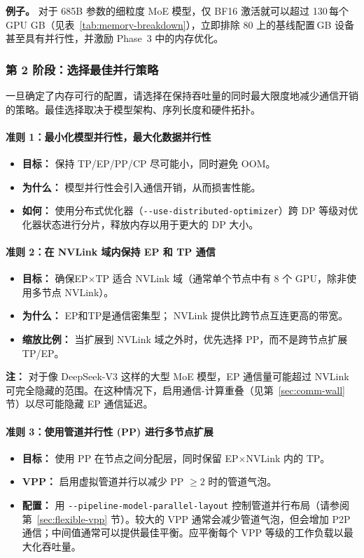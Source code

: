 \documentclass[10pt,logo,copyright]{nvidiatechreport_zh}
\begin{document}
\noindent\textbf{例子。} 对于 685B 参数的细粒度 MoE 模型，仅 BF16 激活就可以超过 130\,每个 GPU GB（见表~\ref{tab:memory-breakdown}），立即排除 80 上的基线配置\,GB 设备甚至具有并行性，并激励 Phase~3 中的内存优化。

\subsubsection{第 2 阶段：选择最佳并行策略}

一旦确定了内存可行的配置，请选择在保持吞吐量的同时最大限度地减少通信开销的策略。最佳选择取决于模型架构、序列长度和硬件拓扑。

\paragraph*{准则 1：最小化模型并行性，最大化数据并行性}
\begin{itemize}
    \item \textbf{目标：} 保持 TP/EP/PP/CP 尽可能小，同时避免 OOM。
    \item \textbf{为什么：} 模型并行性会引入通信开销，从而损害性能。
    \item \textbf{如何：} 使用分布式优化器（\texttt{-{}-use-distributed-optimizer}）跨 DP 等级对优化器状态进行分片，释放内存以用于更大的 DP 大小。
\end{itemize}

\paragraph*{准则 2：在 NVLink 域内保持 EP 和 TP 通信}
\begin{itemize}
    \item \textbf{目标：} 确保EP$\times$TP 适合 NVLink 域（通常单个节点中有 8 个 GPU，除非使用多节点 NVLink）。
    \item \textbf{为什么：} EP和TP是通信密集型； NVLink 提供比跨节点互连更高的带宽。
    \item \textbf{缩放比例：} 当扩展到 NVLink 域之外时，优先选择 PP，而不是跨节点扩展 TP/EP。
\end{itemize}

\noindent\textbf{注：} 对于像 DeepSeek-V3 这样的大型 MoE 模型，EP 通信量可能超过 NVLink 可完全隐藏的范围。在这种情况下，启用通信-计算重叠（见第~\ref{sec:comm-wall} 节）以尽可能隐藏 EP 通信延迟。

\paragraph*{准则 3：使用管道并行性 (PP) 进行多节点扩展}
\begin{itemize}
    \item \textbf{目标：} 使用 PP 在节点之间分配层，同时保留 EP$\times$NVLink 内的 TP。
    \item \textbf{VPP：} 启用虚拟管道并行以减少 PP $\geq 2$ 时的管道气泡。
    \item \textbf{配置：} 用 \texttt{-{}-pipeline-model-parallel-layout} 控制管道并行布局（请参阅第~\ref{sec:flexible-vpp} 节）。较大的 VPP 通常会减少管道气泡，但会增加 P2P 通信；中间值通常可以提供最佳平衡。应平衡每个 VPP 等级的工作负载以最大化吞吐量。
\end{itemize}
\end{document}
